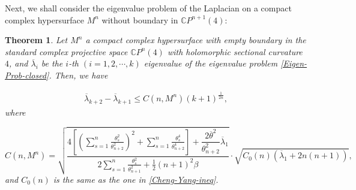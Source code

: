\documentclass[12pt]{article}
\newtheorem{thm}{Theorem}[section]
\numberwithin{equation}{section}
\begin{document}
Next, we shall consider the eigenvalue problem of the Laplacian on a
compact complex hypersurface $M^{n}$ without boundary in $\mathbb{C}P^{n+1}(4)$:

\begin{thm}\label{thm5.2} Let $M^{n}$ a compact complex hypersurface with empty boundary
in the standard complex projective space $\mathbb{C}P^{n}(4)$ with holomorphic sectional curvature $4$,
and $\overline{\lambda}_{i}$ be the $i$-th $(i=1,2,\cdots,k)$
eigenvalue of the eigenvalue problem \eqref{Eigen-Prob-closed}. Then, we have

\begin{equation}\begin{aligned}\overline{\lambda}_{k+2}-\overline{\lambda}_{k+1}\leq C(n,M^{n})(k+1)^{\frac{1}{2n}},
\end{aligned}\end{equation} where

\begin{equation*}C(n,M^{n})=\sqrt{\frac{4\left[\left(\sum^{n}_{s=1}\frac{\theta_{s}^{2}}{\theta_{n+2}^{2}}\right)^{2}+\sum^{n}_{s=1}\frac{\theta_{s}^{4}}{\theta_{n+2}^{4}}\right]
+\dfrac{2\overline{\theta}^{2}}{\theta^{2}_{n+2}}\overline{\lambda}_{1}}
{2\sum^{n}_{s=1}\frac{\theta_{s}^{2}}{\theta_{n+1}^{2}}+\frac{1}{2}(n+1)^{2}\beta}}\cdot\sqrt{C_{0}(n)(\overline{\lambda}_{1}+2n(n+1))},\end{equation*}
 and $C_{0}(n)$ is the same as the one in \eqref{Cheng-Yang-ineq}. \end{thm}
\end{document}
